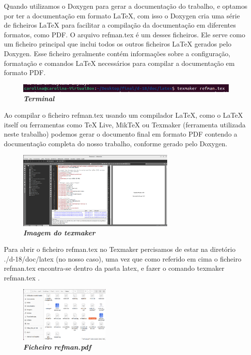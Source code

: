 \documentclass[a4wide]{report}
\begin{document}
{{{{Quando utilizamos o Doxygen para gerar a documentação do trabalho, e optamos por ter a documentação em formato LaTeX, com isso o Doxygen cria uma série de ficheiros LaTeX para facilitar a compilação da documentação em diferentes formatos, como PDF. 
O arquivo refman.tex é um desses ficheiros. Ele serve como um ficheiro principal que inclui todos os outros ficheiros LaTeX gerados pelo Doxygen. Esse ficheiro geralmente contém informações sobre a configuração, formatação e comandos LaTeX necessários para compilar a documentação em formato PDF. 
\begin{figure}[hbt]
    \centering
    \includegraphics[width=1.00\textwidth]{imagem_16.png}
    \caption{\textbf{\textit{Terminal}} \label{fig:imagem}}
\end{figure}

\newpage
Ao compilar o ficheiro refman.tex usando um compilador LaTeX, como o LaTeX itself ou ferramentas como TeX Live, MikTeX ou Texmaker (ferramenta utilizada neste trabalho) podemos gerar o documento final em formato PDF contendo a documentação completa do nosso trabalho, conforme gerado pelo Doxygen.
\begin{figure}[hbt]
    \centering
    \includegraphics[width=0.70\textwidth]{imagem_17.png}
    \caption{\textbf{\textit{Imagem do texmaker}} \label{fig:imagem}}
\end{figure}

Para abrir o ficheiro refman.tex no Texmaker percisamos de estar na diretório ./d-18/doc/latex (no nosso caso), uma vez que como referido em cima o ficheiro refman.tex encontra-se dentro da pasta latex, e fazer o comando texmaker refman.tex . 
\begin{figure}[hbt]
    \centering
    \includegraphics[width=0.40\textwidth]{imagem_18.png}
    \caption{\textbf{\textit{Ficheiro refman.pdf }}\label{fig:imagem}}
\end{figure}



}}}}
\end{document}
